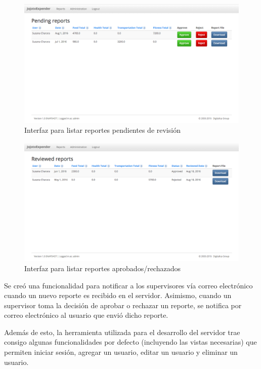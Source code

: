\begin{figure}[ht]
  \centering
  \includegraphics[scale=0.38,type=png,ext=.png,read=.png]{imagenes/pending_reports}
  \captionsetup{justification=centering}
  \caption{Interfaz para listar reportes pendientes de revisión}
  \label{fig:interfazListarReportesPendientes}
\end{figure}

\begin{figure}[h]
  \centering
  \includegraphics[scale=0.38,type=png,ext=.png,read=.png]{imagenes/reviewed_reports}
  \captionsetup{justification=centering}
  \caption{Interfaz para listar reportes aprobados/rechazados}
  \label{fig:interfazListarReportesRevisados}
\end{figure}


Se creó una funcionalidad para notificar a los supervisores vía correo electrónico cuando un nuevo reporte es recibido en el servidor. Asimismo, cuando un supervisor toma la decisión de aprobar o rechazar un reporte, se notifica por correo electrónico al usuario que envió dicho reporte.

Además de esto, la herramienta utilizada para el desarrollo del servidor trae consigo algunas funcionalidades por defecto (incluyendo las vistas necesarias) que permiten iniciar sesión, agregar un usuario, editar un usuario y eliminar un usuario. 

